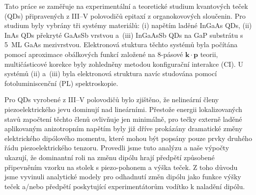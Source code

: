 \documentclass[
a4paper, %
11pt, %
onecolumn, %
openany, %
oldfontcommands,
]{memoir}
\begin{document}



\noindent Tato práce se zaměřuje na experimentální a teoretické studium kvantových teček (QDs) připrave\-ných z III--V polovodičů epitaxí z organokovových sloučenin. Pro studium byly vybrány tři systémy materiálů: (i) napětím laděné InGaAs QDs, (ii) InAs QDs překryté GaAsSb vrstvou a~(iii) InGaAsSb QDs na GaP substrátu s 5~ML GaAs mezivrstvou. Elektronová stuktura těchto systémů byla počítána pomocí aproximace obálkových funkcí založené na 8-pásové $\mathbf{k\cdot p}$ teorii, multičásticové korekce byly zohledněny metodou konfigurační interakce (CI). U systémů (ii) a~(iii) byla elektronová struktura navíc studována pomocí fotoluminiscenční (PL) spektroskopie. 

Pro QDs vyrobené z III--V polovodičů bylo zjištěno, že nelineární členy piezoelektrického jevu dominují nad lineárními. Přestože energii lokalizovaných stavů započtení těchto členů ovlivňuje jen minimálně, pro tečky externě laděné aplikovaným anizotropním napětím byly již dříve prokázány dramatické změny elektrického dipólového momentu, které mohou být popsány pouze prvky druhého řádu piezoelektrického tenzoru. Provedli jsme tuto analýzu a naše výpočty ukazují, že dominantní roli na změnu dipólu hrají předpětí způsobené připevněním vzorku na stolek s piezo-pohonem a výška teček. Z toho důvodu jsme vyvinuli analytické modely pro odhadnutí změn dipólu jako funkce výšky teček a/nebo předpětí poskytující experimentátorům vodítko k naladění dipólu.
\end{document}
